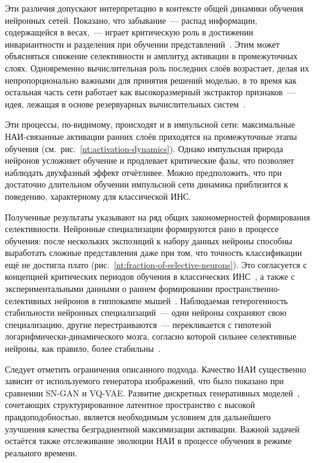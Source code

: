 Эти различия допускают интерпретацию в контексте общей динамики обучения нейронных сетей. Показано, что забывание~--- распад информации, содержащейся в весах,~--- играет критическую роль в достижении инвариантности и разделения при обучении представлений~\cite{critical-learning-periods}. Этим может объясняться снижение селективности и амплитуд активации в промежуточных слоях. Одновременно вычислительная роль последних слоёв возрастает, делая их непропорционально важными для принятия решений моделью, в то время как остальная часть сети работает как высокоразмерный экстрактор признаков~--- идея, лежащая в основе резервуарных вычислительных систем~\cite{Gauthier2021}.

Эти процессы, по-видимому, происходят и в импульсной сети: максимальные НАИ-связанные активации ранних слоёв приходятся на промежуточные этапы обучения (см.~рис.~\ref{nt:activation-dynamics}). Однако импульсная природа нейронов усложняет обучение и продлевает критические фазы, что позволяет наблюдать двухфазный эффект отчётливее. Можно предположить, что при достаточно длительном обучении импульсной сети динамика приблизится к поведению, характерному для классической ИНС.

\medskip

Полученные результаты указывают на ряд общих закономерностей формирования селективности. Нейронные специализации формируются рано в процессе обучения: после нескольких экспозиций к набору данных нейроны способны выработать сложные представления даже при том, что точность классификации ещё не достигла плато (рис.~\ref{nt:fraction-of-selective-neurons}). Это согласуется с концепцией критических периодов обучения в классических ИНС~\cite{critical-learning-periods}, а также с экспериментальными данными о раннем формировании пространственно-селективных нейронов в гиппокампе мышей~\cite{Sotskov2022}. Наблюдаемая гетерогенность стабильности нейронных специализаций~--- одни нейроны сохраняют свою специализацию, другие перестраиваются~--- перекликается с гипотезой логарифмически-динамического мозга, согласно которой сильнее селективные нейроны, как правило, более стабильны~\cite{log_dynamic}.

Следует отметить ограничения описанного подхода. Качество НАИ существенно зависит от используемого генератора изображений, что было показано при сравнении SN-GAN и VQ-VAE. Развитие дискретных генеративных моделей~\cite{Taming-transformers}, сочетающих структурированное латентное пространство с высокой правдоподобностью, является необходимым условием для дальнейшего улучшения качества безградиентной максимизации активации. Важной задачей остаётся также отслеживание эволюции НАИ в процессе обучения в режиме реального времени.

